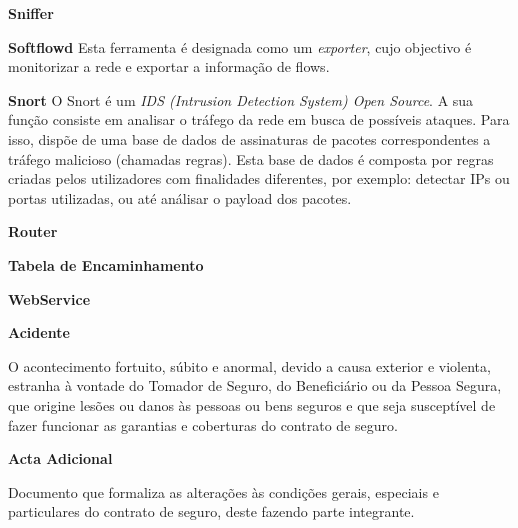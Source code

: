 \begin{description}
    \item \textbf{Sniffer}
\end{description}

\begin{description}
    \item \textbf{Softflowd} 
Esta ferramenta é designada como um \textit{exporter}, cujo objectivo é monitorizar a rede e exportar a informação de flows.
\end{description}

\begin{description}
    \item \textbf{Snort}
O Snort é um \textit{IDS (Intrusion Detection System) Open Source}. A sua função consiste em analisar o tráfego da rede em busca de possíveis ataques. Para isso, dispõe de uma base de dados de assinaturas de pacotes correspondentes a tráfego malicioso (chamadas regras). Esta base de dados é composta por regras criadas pelos utilizadores com finalidades diferentes, por exemplo: detectar IPs ou portas utilizadas, ou até análisar o payload dos pacotes.
\end{description}

\begin{description}
    \item \textbf{Router}
\end{description}

\begin{description}
    \item \textbf{Tabela de Encaminhamento}
\end{description}

\begin{description}
    \item \textbf{WebService}
\end{description}




\begin{description}
\item \textbf{Acidente}

O acontecimento fortuito, súbito e anormal, devido a causa exterior e violenta, estranha à vontade do Tomador de Seguro, do Beneficiário ou da Pessoa Segura, que origine lesões ou danos às pessoas ou bens seguros e que seja susceptível de fazer funcionar as garantias e coberturas do contrato de seguro.
\end{description}

\begin{description}
\item \textbf{Acta Adicional}

Documento que formaliza as alterações às condições gerais, especiais e particulares do contrato de seguro, deste fazendo parte integrante.
\end{description}

